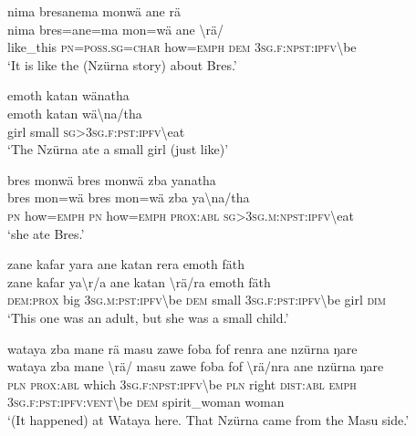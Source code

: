 \ea\label{ex:6:a1336}
nima bresanema monwä ane rä\\
\gll nima	bres=ane=ma	mon=wä	ane	{\textbackslash}rä/\\
     like\_this	\textsc{pn}=\textsc{poss}.\textsc{sg}=\textsc{char}	how=\textsc{emph}	\textsc{dem}	3\textsc{sg}.\textsc{f}:\textsc{npst}:\textsc{ipfv}{\textbackslash}be\\
\glt `It is like the (Nzürna story) about Bres.'
\z

\newpage
\ea\label{ex:6:a1337}
emoth katan wänatha\\
\gll emoth	katan	wä{\textbackslash}na/tha\\
     girl	small	\textsc{sg}>3\textsc{sg}.\textsc{f}:\textsc{pst}:\textsc{ipfv}{\textbackslash}eat\\
\glt `The Nzürna ate a small girl (just like)'
\z

\ea\label{ex:6:a1338}
bres monwä bres monwä zba yanatha\\
\gll bres	mon=wä	bres	mon=wä	zba	ya{\textbackslash}na/tha\\
     \textsc{pn}	how=\textsc{emph}	\textsc{pn}	how=\textsc{emph}	\textsc{prox}:\textsc{abl}	\textsc{sg}>3\textsc{sg}.\textsc{m}:\textsc{npst}:\textsc{ipfv}{\textbackslash}eat\\
\glt `she ate Bres.'
\z

\ea\label{ex:6:a1339}
zane kafar yara ane katan rera emoth fäth\\
\gll zane	kafar	ya{\textbackslash}r/a	ane	katan	{\textbackslash}rä/ra	emoth	fäth\\
     \textsc{dem}:\textsc{prox}	big	3\textsc{sg}.\textsc{m}:\textsc{pst}:\textsc{ipfv}{\textbackslash}be	\textsc{dem}	small	3\textsc{sg}.\textsc{f}:\textsc{pst}:\textsc{ipfv}{\textbackslash}be	girl	\textsc{dim}\\
\glt `This one was an adult, but she was a small child.'
\z

\ea\label{ex:6:a1340}
wataya zba mane rä masu zawe foba fof renra ane nzürna ŋare\\
\gll wataya	zba	mane	{\textbackslash}rä/	masu	zawe	foba	fof	{\textbackslash}rä/nra	ane	nzürna	ŋare\\
     \textsc{pln}	\textsc{prox}:\textsc{abl}	which	3\textsc{sg}.\textsc{f}:\textsc{npst}:\textsc{ipfv}{\textbackslash}be	\textsc{pln}	right	\textsc{dist}:\textsc{abl}	\textsc{emph}	3\textsc{sg}.\textsc{f}:\textsc{pst}:\textsc{ipfv}:\textsc{vent}{\textbackslash}be	\textsc{dem}	spirit\_woman	woman\\
\glt `(It happened) at Wataya here. That Nzürna came from the Masu side.'
\z
